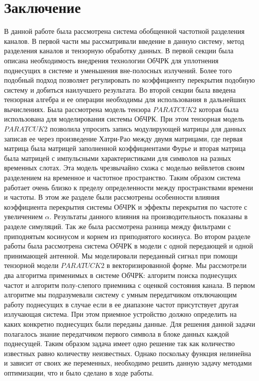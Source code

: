 
\chapter{Заключение}
В данной работе была рассмотрена система обобщенной частотной разделения каналов. В первой части мы рассматривали введение в данную систему, метод разделения каналов и тензорную обработку данных. В первой секции была описана необходимость внедрения технологии ОбЧРК для уплотнения поднесущих в системе и уменьшения вне-полосных излучений. Более того подобный подход позволяет регулировать по коэффициенту перекрытия подобную систему и добиться наилучшего результата. Во второй секции была введена тензорная алгебра и ее операции необходимы для использования в дальнейших вычислениях. Была рассмотрена модель тензора $PARATCUK2$ которая была использована для моделирования системы ОбЧРК. При этом тензорная модель $PARATCUK2$ позволила упросить запись модулирующей матрицы для данных записав ее через произведение Хатри-Рао между двумя матрицами, где первая матрица была матрицей заполненной коэффициентами Фурье и вторая матрица была матрицей с импульсными характеристиками для символов на разных временных слотах. Эта модель чрезвычайно схожа с моделью вейвлетов своим разделением на временное и частотное пространство. Таким образом система работает очень близко к пределу определенности между пространствами времени и частоты.  В этом же разделе были рассмотрены особенности влияния коэффициента перекрытия системы ОбЧРК и эффекты перекрытия по частоте с увеличением $\alpha$. Результаты данного влияния на производительность показаны в разделе симуляций. Так же была рассмотрена разница между фильтрами с приподнятым косинусом и корнем из приподнятого косинуса.
Во втором разделе работы была рассмотрена система ОбЧРК в модели с одной передающей и одной принимающей антенной. Мы моделировали переданный сигнал при помощи тензорной модели $PARATUCK2$ в векторизированной форме. Мы рассмотрели два алгоритма применимых в системе ОбЧРК: алгоритм поиска поднесущих частот и алгоритм полу-слепого приемника с оценкой состояния канала. В первом алгоритме мы подразумевали систему с умным передатчиком отключающим работу поднесущих в случае если в ее диапазоне частот присутствует другая излучающая система. При этом приемное устройство должно определить на каких конкретно поднесущих были переданы данные. Для решения данной задачи полагалось знание передатчиком первого символа в блоке данных каждой поднесущей. Таким образом задача имеет одно решение так как количество известных равно количеству неизвестных. Однако поскольку функция нелинейна и зависит от своих же переменных, необходимо решить данную задачу методами оптимизации, что и было сделано в ходе работы.
